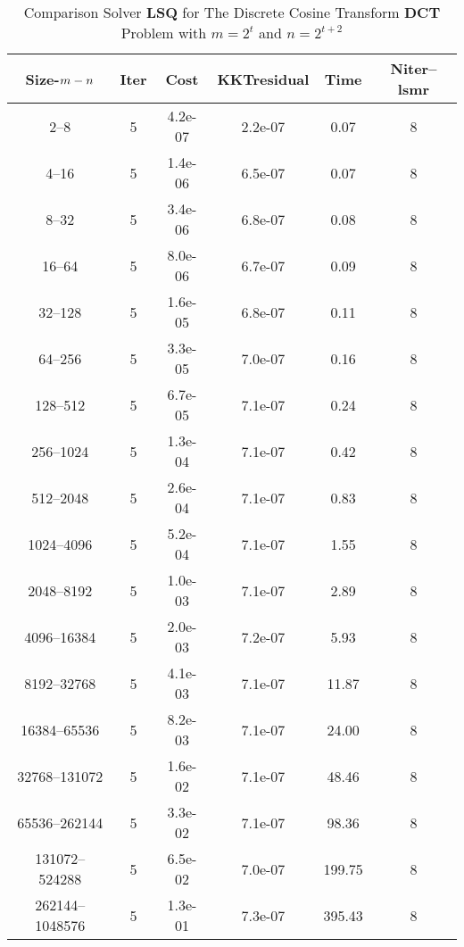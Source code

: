 \documentclass[letterpaper,12pt,oneside,final]{book}
\begin{document}
\begin{table}
\caption{Comparison Solver {\bf LSQ}  for  The Discrete Cosine Transform {\bf DCT} Problem with $m=2^{t}$ and $n=2^{t+2}$}  
\begin{center}
\begin{tabular}{|*{6}{c}|} \hline
Size-$m\--n$ & \multicolumn{1}{c}{Iter} & \multicolumn{1}{c}{Cost}& \multicolumn{1}{c}{KKTresidual} & \multicolumn{1}{c}{Time} & \multicolumn{1}{c|}{Niter--lsmr} \\ 
\hline
2--8           &5    &4.2e-07        &2.2e-07        &0.07           &8    \\ 
4--16          &5    &1.4e-06        &6.5e-07        &0.07           &8    \\ 
8--32          &5    &3.4e-06        &6.8e-07        &0.08           &8    \\ 
16--64         &5    &8.0e-06        &6.7e-07        &0.09           &8    \\ 
32--128        &5    &1.6e-05        &6.8e-07        &0.11           &8    \\ 
64--256        &5    &3.3e-05        &7.0e-07        &0.16           &8    \\ 
128--512       &5    &6.7e-05        &7.1e-07        &0.24           &8    \\ 
256--1024      &5    &1.3e-04        &7.1e-07        &0.42           &8    \\ 
512--2048      &5    &2.6e-04        &7.1e-07        &0.83           &8    \\ 
1024--4096     &5    &5.2e-04        &7.1e-07        &1.55           &8    \\ 
2048--8192     &5    &1.0e-03        &7.1e-07        &2.89           &8    \\ 
4096--16384    &5    &2.0e-03        &7.2e-07        &5.93           &8    \\ 
8192--32768    &5    &4.1e-03        &7.1e-07        &11.87          &8    \\ 
16384--65536   &5    &8.2e-03        &7.1e-07        &24.00          &8    \\ 
32768--131072  &5    &1.6e-02        &7.1e-07        &48.46          &8    \\ 
65536--262144  &5    &3.3e-02        &7.1e-07        &98.36          &8    \\ 
131072--524288 &5    &6.5e-02        &7.0e-07        &199.75         &8    \\ 
262144--1048576&5    &1.3e-01        &7.3e-07        &395.43         &8    \\ 


\end{tabular}
\end{center}
\end{table}
\end{document}
